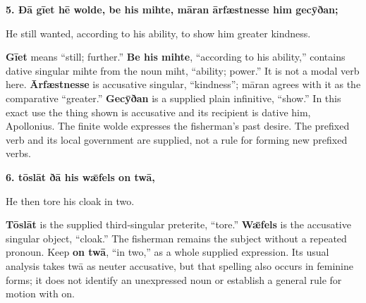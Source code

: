 \textbf{5. Ðā gīet hē wolde, be his mihte, māran ārfæstnesse him gecȳðan;}

He still wanted, according to his ability, to show him greater kindness.

\textbf{Gīet} means “still; further.” \textbf{Be his mihte}, “according to his ability,” contains dative singular mihte from the noun miht, “ability; power.” It is not a modal verb here. \textbf{Ārfæstnesse} is accusative singular, “kindness”; māran agrees with it as the comparative “greater.” \textbf{Gecȳðan} is a supplied plain infinitive, “show.” In this exact use the thing shown is accusative and its recipient is dative him, Apollonius. The finite wolde expresses the fisherman’s past desire. The prefixed verb and its local government are supplied, not a rule for forming new prefixed verbs.

\textbf{6. tōslāt ðā his wǣfels on twā,}

He then tore his cloak in two.

\textbf{Tōslāt} is the supplied third-singular preterite, “tore.” \textbf{Wǣfels} is the accusative singular object, “cloak.” The fisherman remains the subject without a repeated pronoun. Keep \textbf{on twā}, “in two,” as a whole supplied expression. Its usual analysis takes twā as neuter accusative, but that spelling also occurs in feminine forms; it does not identify an unexpressed noun or establish a general rule for motion with on.

